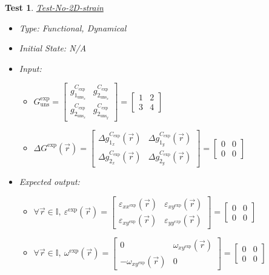 \documentclass[12pt, titlepage]{article}
\newtheorem{Test}{Test}
\begin{document}
\begin{Test}\normalfont\underline{Test-No-2D-strain}
\label{T_No-2D-strain}
\begin{itemize}
\item Type: Functional, Dynamical
\item Initial State: N/A
\item Input:
\begin{itemize}
	\item $G_{\text{uns}}^{\text{exp}} =
	\begin{bmatrix}
	g_{1_{{\text{uns}}_x}}^{C_{\text{exp}}} & g_{2_{{\text{uns}}_x}}^{C_{\text{exp}}} \\
	g_{2_{{\text{uns}}_x}}^{C_{\text{exp}}} & g_{2_{{\text{uns}}_y}}^{C_{\text{exp}}} 
	\end{bmatrix} =\begin{bmatrix}
	1 & 2 \\
	3 & 4 
	\end{bmatrix} $
	\item $\Delta G^{\text{exp}}(\vec{r})=
	\begin{bmatrix}
	\Delta g_{1_{x}}^{C_{\text{exp}}}(\vec{r}) & \Delta g_{1_{y}}^{C_{\text{exp}}}(\vec{r}) \\
	\Delta g_{2_{x}}^{C_{\text{exp}}}(\vec{r}) & \Delta g_{2_{y}}^{C_{\text{exp}}}(\vec{r})
	\end{bmatrix} = \begin{bmatrix}
	0 & 0 \\
	0 & 0 
	\end{bmatrix} $
	\end{itemize} 
\item Expected output:
	\begin{itemize}
	\item  $\forall \vec{r} \in \mathbb{I}, \ \varepsilon^{\text{exp}}(\vec{r}) = \begin{bmatrix}
	\varepsilon_{\mathit{xx}^{\text{exp}}}(\vec{r}) & \varepsilon_{\mathit{xy}^{\text{exp}}}(\vec{r}) \\
	\varepsilon_{\mathit{xy}^{\text{exp}}}(\vec{r}) & \varepsilon_{\mathit{yy^{\text{exp}}}}(\vec{r})
	\end{bmatrix} = \begin{bmatrix}
	0 & 0 \\
	0 & 0 
	\end{bmatrix} $
	\item $\forall \vec{r} \in \mathbb{I}, \  \omega^{\text{exp}}(\vec{r}) = \begin{bmatrix}
	0 & \omega_{\mathit{xy}^{\text{exp}}}(\vec{r}) \\
	-\omega_{\mathit{xy}^{\text{exp}}}(\vec{r}) & 0 
	\end{bmatrix} = \begin{bmatrix}
	0 & 0 \\
	0 & 0 
	\end{bmatrix} $
	\end{itemize}
\end{itemize}
\end{Test}
\end{document}
